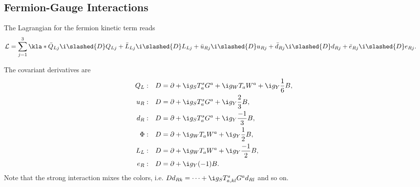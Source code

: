 \documentclass[english, parskip=full]{scrbook}
\newcommand{\example}[3]{\begin{tcolorbox}[colback=colorbackgroundexample,colframe=colorexample, breakable,enhanced,title={\textbf{#1}: #2.}]#3\end{tcolorbox}}
\begin{document}
\subsection{Fermion-Gauge Interactions}
The Lagrangian for the fermion kinetic term reads
\begin{align}
\mathcal{L} &= \sum_{j=1}^3 \kla*{\bar{Q}_{Lj}\i\slashed{D}Q_{Lj} + \bar{L}_{Lj}\i\slashed{D}L_{Lj} + \bar{u}_{Rj}\i\slashed{D}u_{Rj} + \bar{d}_{Rj}\i\slashed{D}d_{Rj} + \bar{e}_{Rj}\i\slashed{D}e_{Rj}}.
\end{align}
\example{Covariant Derivatives}{}{
The covariant derivatives are
\begin{align}
Q_L &:& D &= \partial + \i g_S T_a^s G^a + \i g_W T_aW^a + \i g_Y \frac{1}{6} B,\\
u_R &:& D &= \partial + \i g_S T_a^s G^a + \i g_Y \frac{2}{3} B,\\
d_R &:& D &= \partial + \i g_S T_a^s G^a + \i g_Y \frac{-1}{3} B,\\
\Phi &:& D &= \partial + \i g_W T_aW^a + \i g_Y \frac{1}{2} B,\\
L_L &:& D &= \partial + \i g_W T_aW^a + \i g_Y \frac{-1}{2} B,\\
e_R &:& D &= \partial + \i g_Y (-1) B.
\end{align}
Note that the strong interaction mixes the colors, i.e. $Dd_{Rk} = \dots + \i g_S T_{a,kl}^s G^a d_{Rl}$ and so on.
}
\end{document}
